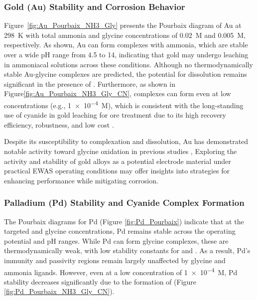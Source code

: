 \documentclass[journal=jacsat,manuscript=article]{achemso}
\begin{document}
\subsubsection{Gold (Au) Stability and Corrosion Behavior}
Figure~\ref{fig:Au_Pourbaix_NH3_Gly} presents the Pourbaix diagram of Au at 298~K with total ammonia and glycine concentrations of 0.02~M and 0.005~M, respectively. As shown, Au can form \ce{[Au(NH3)_2]^+} complexes with ammonia, which are stable over a wide pH range from 4.5 to 14, indicating that gold may undergo leaching in ammoniacal solutions across these conditions. Although no thermodynamically stable Au-glycine complexes are predicted, the potential for dissolution remains significant in the presence of . Furthermore, as shown in Figure\ref{fig:Au_Pourbaix_NH3_Gly_CN}, \ce{[Au(CN)_2]^-} complexes can form even at low  concentrations (e.g., \num{1e-4}~M), which is consistent with the long-standing use of cyanide in gold leaching for ore treatment due to its high recovery efficiency, robustness, and low cost \cite{Hilson2006AlternativesFuture, young2001cyanide}.

Despite its susceptibility to complexation and dissolution, Au has demonstrated notable activity toward glycine oxidation in previous studies \cite{Sandoval2011AdsorptionStudy, Chen2013AdsorptionStudy, Zou1999GoldIII-inducedGlycine}, Exploring the activity and stability of gold alloys as a potential electrode material under practical EWAS operating conditions may offer insights into strategies for enhancing performance while mitigating corrosion.



\subsubsection{Palladium (Pd) Stability and Cyanide Complex Formation} 

The Pourbaix diagrams for Pd (Figure \ref{fig:Pd_Pourbaix}) indicate that at the targeted  and glycine concentrations, Pd remains stable across the operating potential and pH ranges. While Pd can form glycine complexes, these are thermodynamically weak, with low stability constants for \ce{[Pd(Gly)^+]} and \ce{[Pd(Gly)2]}. As a result, Pd’s immunity and passivity regions remain largely unaffected by glycine and ammonia ligands. However, even at a low  concentration of \num{1e-4}~M, Pd stability decreases significantly due to the formation of \ce{[Pd(CN)4^2+]} (Figure \ref{fig:Pd_Pourbaix_NH3_Gly_CN}).
\end{document}
